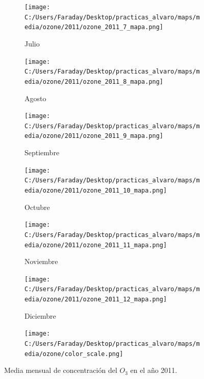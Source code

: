 \documentclass[12pt]{article}
\begin{document}
\begin{figure}[H]
\begin{subfigure}[H]{0.15\textwidth}
\texttt{[image: C:/Users/Faraday/Desktop/practicas\_alvaro/maps/media/ozone/2011/ozone\_2011\_7\_mapa.png]}
\captionsetup{labelformat=empty}
\caption{Julio}
\label{fig:map-ozone-2011-7}
\end{subfigure}
%
\begin{subfigure}[H]{0.15\textwidth}
\texttt{[image: C:/Users/Faraday/Desktop/practicas\_alvaro/maps/media/ozone/2011/ozone\_2011\_8\_mapa.png]}
\captionsetup{labelformat=empty}
\caption{Agosto}
\label{fig:map-ozone-2011-8}
\end{subfigure}
%
\begin{subfigure}[H]{0.15\textwidth}
\texttt{[image: C:/Users/Faraday/Desktop/practicas\_alvaro/maps/media/ozone/2011/ozone\_2011\_9\_mapa.png]}
\captionsetup{labelformat=empty}
\caption{Septiembre}
\label{fig:map-ozone-2011-9}
\end{subfigure}
%
\begin{subfigure}[H]{0.15\textwidth}
\texttt{[image: C:/Users/Faraday/Desktop/practicas\_alvaro/maps/media/ozone/2011/ozone\_2011\_10\_mapa.png]}
\captionsetup{labelformat=empty}
\caption{Octubre}
\label{fig:map-ozone-2011-10}
\end{subfigure}
%
\begin{subfigure}[H]{0.15\textwidth}
\texttt{[image: C:/Users/Faraday/Desktop/practicas\_alvaro/maps/media/ozone/2011/ozone\_2011\_11\_mapa.png]}
\captionsetup{labelformat=empty}
\caption{Noviembre}
\label{fig:map-ozone-2011-11}
\end{subfigure}
%
\begin{subfigure}[H]{0.15\textwidth}
\texttt{[image: C:/Users/Faraday/Desktop/practicas\_alvaro/maps/media/ozone/2011/ozone\_2011\_12\_mapa.png]}
\captionsetup{labelformat=empty}
\caption{Diciembre}
\label{fig:map-ozone-2011-12}
\end{subfigure}

\begin{subfigure}[H]{0.45\textwidth}
\texttt{[image: C:/Users/Faraday/Desktop/practicas\_alvaro/maps/media/ozone/color\_scale.png]}
\captionsetup{labelformat=empty}
\caption{}
\end{subfigure}

\vspace*{-7mm}
\caption{Media mensual de concentración del $O_{3}$ en el año 2011.}
\label{fig:map-ozone-2011}
\end{figure}
\end{document}

